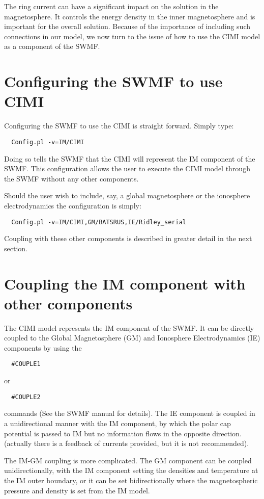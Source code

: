 The ring current can have a significant impact on the solution in the 
magnetosphere. It controls the energy density in the inner magnetosphere and
is important for the overall solution. 
Because of the importance of including 
such connections in our model, we now turn to the issue of how to use the CIMI
model as a component of the SWMF. 

\section{Configuring the SWMF to use CIMI}
Configuring the SWMF to use the CIMI is straight forward. Simply type:
\begin{verbatim}
  Config.pl -v=IM/CIMI
\end{verbatim}
Doing so tells the SWMF that the CIMI will represent the IM component of the 
SWMF. This configuration allows the user to execute the CIMI model through the 
SWMF without any other components.

Should the user wish to include, say, a global magnetosphere or the 
ionosphere electrodynamics the configuration is simply:
\begin{verbatim}
  Config.pl -v=IM/CIMI,GM/BATSRUS,IE/Ridley_serial
\end{verbatim}
Coupling with these other components is described in greater detail in the 
next section.

\section{Coupling the IM component with other components}
The CIMI model represents the IM component of the SWMF. It can be directly coupled 
to the Global Magnetosphere (GM) and Ionosphere Electrodynamics (IE) components 
by using the
\begin{verbatim}
  #COUPLE1
\end{verbatim}
 or
\begin{verbatim}
  #COUPLE2
\end{verbatim}
commands (See the SWMF manual for details). The IE component is coupled 
in a unidirectional manner with the IM component, by which the polar cap 
potential is passed to IM but no information 
flows in the opposite direction. (actually there is a feedback of currents provided, but it is not recommended). 

The IM-GM coupling is more complicated. The GM component can be coupled 
unidirectionally, with the IM component setting the densities and temperature at 
the IM outer boundary, or it can be set bidirectionally where the 
magnetospheric pressure and density is set from the IM model. 

